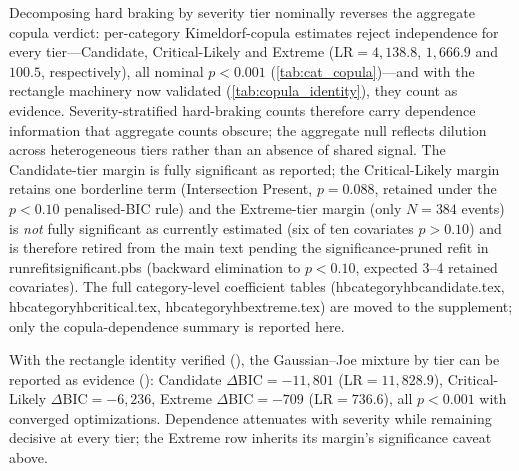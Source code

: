 \documentclass[letterpaper,8pt]{extarticle}  %
\newcommand{\file}[1]{{\ttfamily\def\_{\textunderscore\allowbreak}#1}}
\begin{document}
\begin{doublespacing}
\begin{linenumbers}


\FloatBarrier


Decomposing hard braking by severity tier nominally reverses the aggregate copula verdict: per-category Kimeldorf-copula estimates reject independence for every tier---Candidate, Critical-Likely and Extreme (LR$=4{,}138.8$, $1{,}666.9$ and $100.5$, respectively), all nominal $p<0.001$ (\cref{tab:cat_copula})---and with the rectangle machinery now validated (\cref{tab:copula_identity}), they count as evidence. Severity-stratified hard-braking counts therefore carry dependence information that aggregate counts obscure; the aggregate null reflects dilution across heterogeneous tiers rather than an absence of shared signal. The Candidate-tier margin is fully significant as reported; the Critical-Likely margin retains one borderline term (Intersection Present, $p=0.088$, retained under the $p<0.10$ penalised-BIC rule) and the Extreme-tier margin (only $N=384$ events) is \emph{not} fully significant as currently estimated (six of ten covariates $p>0.10$) and is therefore retired from the main text pending the significance-pruned refit in \file{run\_refit\_significant.pbs} (backward elimination to $p<0.10$, expected 3--4 retained covariates). The full category-level coefficient tables (\file{hb\_category\_hb\_candidate.tex}, \file{hb\_category\_hb\_critical.tex}, \file{hb\_category\_hb\_extreme.tex}) are moved to the supplement; only the copula-dependence summary is reported here.




With the rectangle identity verified (), the Gaussian--Joe mixture by tier can be reported as evidence (): Candidate $\Delta$BIC$=-11{,}801$ (LR$=11{,}828.9$), Critical-Likely $\Delta$BIC$=-6{,}236$, Extreme $\Delta$BIC$=-709$ (LR$=736.6$), all $p<0.001$ with converged optimizations. Dependence attenuates with severity while remaining decisive at every tier; the Extreme row inherits its margin's significance caveat above.



\FloatBarrier
{}

\FloatBarrier



\end{linenumbers}
\end{doublespacing}
\end{document}
